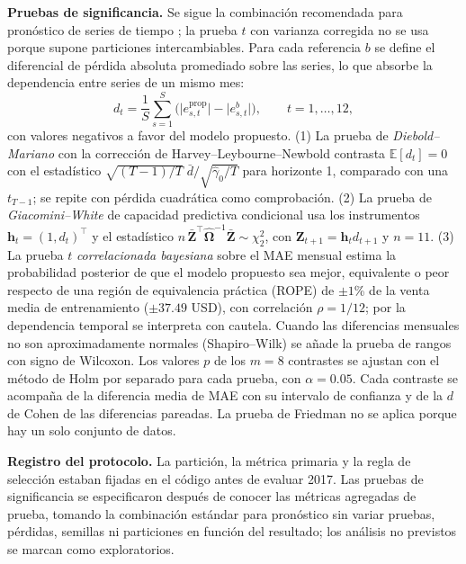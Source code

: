 \documentclass[pdflatex,sn-mathphys-num]{sn-jnl}
\begin{document}
\textbf{Pruebas de significancia.} Se sigue la combinación recomendada para pronóstico de series de tiempo \cite{cerqueira2020}; la prueba $t$ con varianza corregida \cite{nadeau2003} no se usa porque supone particiones intercambiables. Para cada referencia $b$ se define el diferencial de pérdida absoluta promediado sobre las series, lo que absorbe la dependencia entre series de un mismo mes:
\begin{equation}
d_t=\frac{1}{S}\sum_{s=1}^{S}\bigl(\lvert e^{\mathrm{prop}}_{s,t}\rvert-\lvert e^{b}_{s,t}\rvert\bigr),\qquad t=1,\dots,12,
\label{eq:dt}
\end{equation}
con valores negativos a favor del modelo propuesto. (1) La prueba de \emph{Diebold--Mariano} \cite{diebold1995} con la corrección de Harvey--Leybourne--Newbold \cite{harvey1997} contrasta $\mathbb{E}[d_t]=0$ con el estadístico $\sqrt{(T-1)/T}\;\bar{d}/\sqrt{\hat{\gamma}_0/T}$ para horizonte 1, comparado con una $t_{T-1}$; se repite con pérdida cuadrática como comprobación. (2) La prueba de \emph{Giacomini--White} \cite{giacomini2006} de capacidad predictiva condicional usa los instrumentos $\mathbf{h}_t=(1,d_t)^{\top}$ y el estadístico $n\,\bar{\mathbf{Z}}^{\top}\hat{\boldsymbol{\Omega}}^{-1}\bar{\mathbf{Z}}\sim\chi^2_2$, con $\mathbf{Z}_{t+1}=\mathbf{h}_t d_{t+1}$ y $n=11$. (3) La prueba $t$ \emph{correlacionada bayesiana} \cite{corani2015,benavoli2017} sobre el MAE mensual estima la probabilidad posterior de que el modelo propuesto sea mejor, equivalente o peor respecto de una región de equivalencia práctica (ROPE) de $\pm1$\% de la venta media de entrenamiento ($\pm37.49$ USD), con correlación $\rho=1/12$; por la dependencia temporal se interpreta con cautela. Cuando las diferencias mensuales no son aproximadamente normales (Shapiro--Wilk) se añade la prueba de rangos con signo de Wilcoxon. Los valores $p$ de los $m=8$ contrastes se ajustan con el método de Holm \cite{holm1979} por separado para cada prueba, con $\alpha=0.05$. Cada contraste se acompaña de la diferencia media de MAE con su intervalo de confianza y de la $d$ de Cohen de las diferencias pareadas. La prueba de Friedman no se aplica porque hay un solo conjunto de datos.

\textbf{Registro del protocolo.} La partición, la métrica primaria y la regla de selección estaban fijadas en el código antes de evaluar 2017. Las pruebas de significancia se especificaron después de conocer las métricas agregadas de prueba, tomando la combinación estándar para pronóstico sin variar pruebas, pérdidas, semillas ni particiones en función del resultado; los análisis no previstos se marcan como exploratorios.
\end{document}
